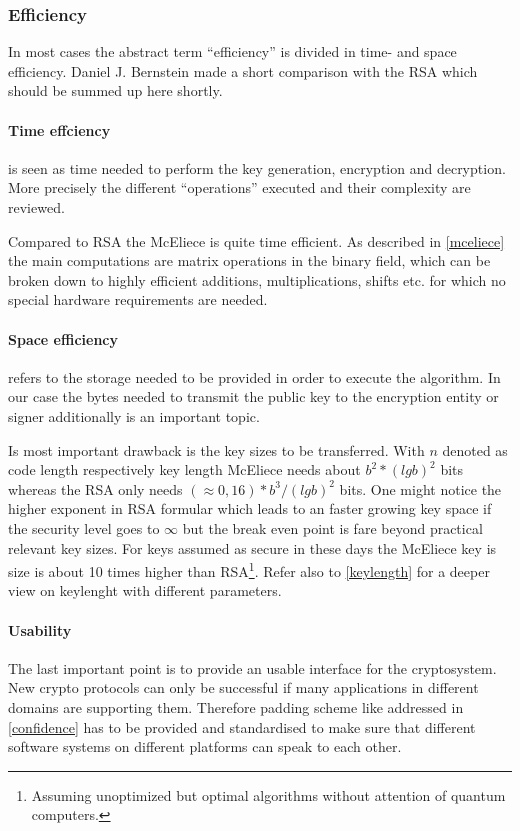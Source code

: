 \subsubsection*{Efficiency}
In most cases the abstract term ``efficiency'' is divided in time- and space efficiency. Daniel J. Bernstein made \cite{bernstein2009introduction} a short comparison with the RSA which should be summed up here shortly. 

\paragraph*{Time effciency} is seen as time needed to perform the key generation, encryption and decryption. More precisely the different ``operations'' executed and their complexity are reviewed. 

Compared to RSA the McEliece is quite time efficient. As described in \autoref{mceliece} the main computations are matrix operations in the binary field, which can be broken down to highly efficient additions, multiplications, shifts etc. for which no special hardware requirements are needed\cite{bernstein2009introduction}.

\paragraph*{Space efficiency} \label{space_efficiency} refers to the storage needed to be provided in order to execute the algorithm. In our case the bytes needed to transmit the public key to the encryption entity or signer additionally is an important topic. 

Is most important drawback is the key sizes to be transferred. With $n$ denoted as code length respectively key length McEliece needs about $b^2*(lg b)^2$ bits whereas the RSA only needs $(\approx 0,16)*b^3/(lg b)^2$ bits. One might notice the higher exponent in RSA formular which leads to an faster growing key space if the security level goes to $\infty$ but the break even point  is fare beyond practical relevant key sizes. For keys assumed as secure in these days the McEliece key is size is about 10 times higher than RSA\footnote{Assuming unoptimized but optimal algorithms without attention of quantum computers.}. Refer also to \autoref{keylength} for a deeper view on keylenght with different parameters.

\paragraph*{Usability}
The last important point is to provide an usable interface for the cryptosystem. New crypto protocols can only be successful if many applications in different domains are supporting them. Therefore padding scheme like addressed in \autoref{confidence} has to be provided and standardised to make sure that different software systems on different platforms can speak to each other. 

